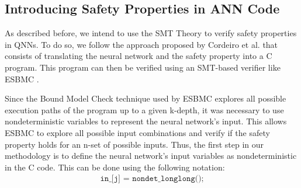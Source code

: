 \subsection{Introducing Safety Properties in ANN Code}\label{sec:safety_prop}


As described before, we intend to use the SMT Theory to verify safety properties in QNNs. To do so, we follow the approach proposed by Cordeiro et al. \cite{cordeiro2025neuralnetworkverificationprogramming} that consists of translating the neural network and the safety property into a C program. This program can then be verified using an SMT-based verifier like ESBMC \cite{esbmc2025}.

Since the Bound Model Check technique used by ESBMC explores all possible execution paths of the program up to a given k-depth, it was necessary to use nondeterministic variables to represent the neural network’s input. This allows ESBMC to explore all possible input combinations and verify if the safety property holds for an n-set of possible inputs. Thus, the first step in our methodology is to define the neural network's input variables as nondeterministic in the C code. This can be done using the following notation:
\begin{equation}
    \begin{aligned}
    \texttt{in\_[j] = nondet\_longlong();}
    \end{aligned}
\end{equation}

